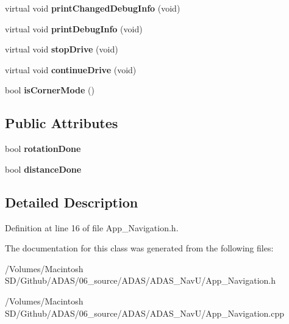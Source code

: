 \begin{DoxyCompactItemize}
virtual void {\bfseries print\+Changed\+Debug\+Info} (void)
\item 
\mbox{\label{class_c_navigation_a84e320cd8975593ab6f966e8794b2886}} 
virtual void {\bfseries print\+Debug\+Info} (void)
\item 
\mbox{\label{class_c_navigation_a06ce71124d487f1f9febf36a0e4b2a5d}} 
virtual void {\bfseries stop\+Drive} (void)
\item 
\mbox{\label{class_c_navigation_ab3d29f3ab4a8a922f5af439f6d78aded}} 
virtual void {\bfseries continue\+Drive} (void)
\item 
\mbox{\label{class_c_navigation_aa984fc062deefed13a85d866d997de73}} 
bool {\bfseries is\+Corner\+Mode} ()
\end{DoxyCompactItemize}
\subsection*{Public Attributes}
\begin{DoxyCompactItemize}
\item 
\mbox{\label{class_c_navigation_a9f452e6ebd491583b6d309974086c86b}} 
bool {\bfseries rotation\+Done}
\item 
\mbox{\label{class_c_navigation_aa28ab8bd516f40905d4d7d113dc7f89d}} 
bool {\bfseries distance\+Done}
\end{DoxyCompactItemize}


\subsection{Detailed Description}


Definition at line 16 of file App\+\_\+\+Navigation.\+h.



The documentation for this class was generated from the following files\+:\begin{DoxyCompactItemize}
\item 
/\+Volumes/\+Macintosh S\+D/\+Github/\+A\+D\+A\+S/06\+\_\+source/\+A\+D\+A\+S/\+A\+D\+A\+S\+\_\+\+Nav\+U/App\+\_\+\+Navigation.\+h\item 
/\+Volumes/\+Macintosh S\+D/\+Github/\+A\+D\+A\+S/06\+\_\+source/\+A\+D\+A\+S/\+A\+D\+A\+S\+\_\+\+Nav\+U/App\+\_\+\+Navigation.\+cpp\end{DoxyCompactItemize}
